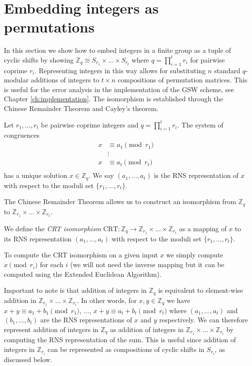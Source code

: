 \section{Embedding integers as permutations}\label{sec:embedding}
In this section we show how to embed integers in a finite group as a tuple of cyclic shifts by showing $\mathbb{Z}_q \cong S_{r_1} \times \dots \times S_{r_t}$ where $q = \prod_{i=1}^t r_i$ for pairwise coprime $r_i$. Representing integers in this way allows for substituting $n$ standard $q$-modular additions of integers to $t \times n$ compositions of permutation matrices. This is useful for the error analysis in the implementation of the GSW scheme, see Chapter \ref{ch:implementation}. The isomorphism is established through the Chinese Remainder Theorem and Cayley's theorem.
\begin{theorem}
    Let $r_1, \dots, r_t$ be pairwise coprime integers and $q = \prod_{i=1}^t r_i$.
    The system of congruences
    \begin{equation*}
    \begin{array}{rl}
        x & \equiv a_1 \pmod{r_1} \\
        &  \vdots \\
        x & \equiv a_t \pmod{r_t} \\
    \end{array}
    \end{equation*}
    has a unique solution $x \in \mathbb{Z}_q$.
    We say $(a_1, \dots, a_t)$ is the RNS representation of $x$ with respect to the moduli set $\{r_1, \dots, r_t\}$.
\end{theorem}
The Chinese Remainder Theorem allows us to construct an isomorphism from $\mathbb{Z}_q$ to $\mathbb{Z}_{r_1} \times \dots \times \mathbb{Z}_{r_t}$.
\begin{definition}
    We define the \textit{CRT isomorphism} $\textrm{CRT} \colon \mathbb{Z}_q \rightarrow \mathbb{Z}_{r_1} \times \dots \times \mathbb{Z}_{r_t}$ as a mapping of $x$ to its RNS representation $(a_1, \dots, a_t)$ with respect to the moduli set $\{r_1, \dots, r_t\}$.
\end{definition}
\begin{remark}
    To compute the CRT isomorphism on a given input $x$ we simply compute $x \pmod r_i$ for each $i$ (we will not need the inverse mapping but it can be computed using the Extended Euclidean Algorithm).
\end{remark}
Important to note is that addition of integers in $\mathbb{Z}_q$ is equivalent to element-wise addition in $\mathbb{Z}_{r_1} \times \dots \times \mathbb{Z}_{r_t}$. In other words, for $x, y \in \mathbb{Z}_q$ we have $x + y \equiv a_1 + b_1 \pmod{r_1}$, $\dots$, $x + y \equiv a_t + b_t \pmod{r_t}$ where $(a_1, \dots, a_t)$ and $(b_1, \dots, b_t)$ are the RNS representations of $x$ and $y$ respectively. We can therefore represent addition of integers in $\mathbb{Z}_q$ as addition of integers in $\mathbb{Z}_{r_1} \times \dots \times \mathbb{Z}_{r_t}$ by computing the RNS representation of the sum. This is useful since addition of integers in $\mathbb{Z}_{r_i}$ can be represented as compositions of cyclic shifts in $S_{r_i}$, as discussed below.
